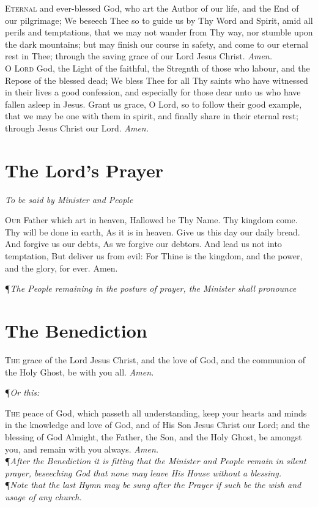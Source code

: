\noindent\lettrine{E}{ternal} and ever-blessed God, who art the Author of our life, and the End of our pilgrimage; We beseech Thee so to guide us by Thy Word and Spirit, amid all perils and temptations, that we may not wander from Thy way, nor stumble upon the dark mountains; but may finish our course in safety, and come to our eternal rest in Thee; through the saving grace of our Lord Jesus Christ.
\textit{Amen.} \\

\noindent\lettrine{O}{ Lord} God, the Light of the faithful, the Stregnth of those who labour, and the Repose of the blessed dead; We bless Thee for all Thy saints who have witnessed in their lives a good confession, and especially for those dear unto us who have fallen asleep in Jesus.
Grant us grace, O Lord, so to follow their good example, that we may be one with them in spirit, and finally share in their eternal rest; through Jesus Christ our Lord.
\textit{Amen.}

\section*{The Lord's Prayer}

{\centering \textit{To be said by Minister and People} \par}
\vspace{1ex}

\lettrine{O}{ur} Father which art in heaven, Hallowed be Thy Name.
Thy kingdom come.
Thy will be done in earth, As it is in heaven.
Give us this day our daily bread.
And forgive us our debts, As we forgive our debtors.
And lead us not into temptation, But deliver us from evil:
For Thine is the kingdom, and the power, and the glory, for ever.
Amen.

\noindent\P \textit{The People remaining in the posture of prayer, the Minister shall pronounce}

\section*{The Benediction}

\lettrine{T}{he} grace of the Lord Jesus Christ, and the love of God, and the communion of the Holy Ghost, be with you all.
\textit{Amen.} \\

{\centering \P \textit{Or this:} \par}
\vspace{1ex}
\noindent\lettrine{T}{he} peace of God, which passeth all understanding, keep your hearts and minds in the knowledge and love of God, and of His Son Jesus Christ our Lord; and the blessing of God Almight, the Father, the Son, and the Holy Ghost, be amongst you, and remain with you always.
\textit{Amen.} \\

\noindent\P \textit{After the Benediction it is fitting that the Minister and People remain in silent prayer, beseeching God that none may leave His House without a blessing.} \\

\noindent\P \textit{Note that the last Hymn may be sung after the Prayer if such be the wish and usage of any church.}
